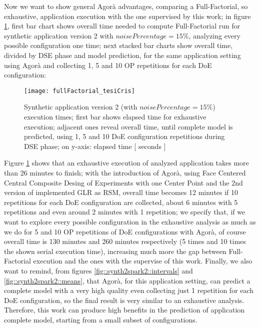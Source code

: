 Now we want to show general Agorà advantages, comparing a Full-Factorial, so exhaustive, application execution with the one supervised by this work; in figure \ref{fig::full_cris}, first bar chart shows overall time needed to compute Full-Factorial run for synthetic application version 2 with $noisePercentage = 15\%$, analyzing every possible configuration one time; next stacked bar charts show overall time, divided by DSE phase and model prediction, for the same application setting using Agorà and collecting 1, 5 and 10 OP repetitions for each DoE configuration:

\begin{figure}[H]

    \centering
    \texttt{[image: fullFactorial\_tesiCris]}
    \caption[Synthetic application version 2 execution times]{Synthetic application version 2 (with $noisePercentage = 15\%$) execution times; first bar shows elapsed time for exhaustive execution; adjacent ones reveal overall time, until complete model is predicted, using 1, 5 and 10 DoE configuration repetitions during DSE phase; on y-axis: elapsed time [ seconds ]}
    \label{fig::full_cris}
    
\end{figure}

Figure \ref{fig::full_cris} shows that an exhaustive execution of analyzed application takes more than 26 minutes to finish; with the introduction of Agorà, using Face Centered Central Composite Desing of Experiments with one Center Point and the 2nd version of implemented GLR as RSM, overall time becomes 12 minutes if 10 repetitions for each DoE configuration are collected, about 6 minutes with 5 repetitions and even around 2 minutes with 1 repetition; we specify that, if we want to explore every possible configuration in the exhaustive analysis as much as we do for 5 and 10 OP repetitions of DoE configurations with Agorà, of course overall time is 130 minutes and 260 minutes respectively (5 times and 10 times the shown serial execution time), increasing much more the gap between Full-Factorial execution and the ones with the supervise of this work. Finally, we also want to remind, from figures \ref{fig::synth2spark2::intervals} and \ref{fig::synth2spark2::means}, that Agorà, for this application setting, can predict a complete model with a very high quality even collecting just 1 repetition for each DoE configuration, so the final result is very similar to an exhaustive analysis. Therefore, this work can produce high benefits in the prediction of application complete model, starting from a small subset of configurations.


